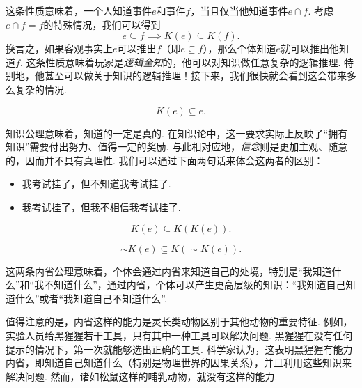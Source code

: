 这条性质意味着，一个人知道事件$e$和事件$f$，当且仅当他知道事件$e\cap f$. 考虑$e\cap f=f$的特殊情况，我们可以得到
\[e\subseteq f\implies K(e)\subseteq K(f).\]
换言之，如果客观事实上$e$可以推出$f$（即$e\subseteq f$），那么个体知道$e$就可以推出他知道$f$. 这条性质意味着玩家是\textit{逻辑全知}的，他可以对知识做任意复杂的逻辑推理. 特别地，他甚至可以做关于知识的逻辑推理！接下来，我们很快就会看到这会带来多么复杂的情况. 

\begin{proposition}
    \begin{equation}
        K(e)\subseteq e.\tag{K2}\label{eq:K2-knowledge}
    \end{equation}
\end{proposition}
知识公理意味着，知道的一定是真的. 在知识论中，这一要求实际上反映了“拥有知识”需要付出努力、值得一定的奖励. 与此相对应地，\textit{信念}则是更加主观、随意的，因而并不具有真理性. 我们可以通过下面两句话来体会这两者的区别：
    \begin{itemize}
        \item 我考试挂了，但不知道我考试挂了.
        \item 我考试挂了，但我不相信我考试挂了.
    \end{itemize}

\begin{proposition}[正内省公理]
    \begin{equation}
        K(e)\subseteq K(K(e)).\tag{K3}\label{eq:K3-positive-introspection}
    \end{equation}
\end{proposition}

\begin{proposition}[负内省公理]
    \begin{equation}
        \sim K(e)\subseteq K(\sim K(e)).\tag{K4}\label{eq:K4-negative-introspection}
    \end{equation}
\end{proposition}

这两条内省公理意味着，个体会通过内省来知道自己的处境，特别是“我知道什么”和“我不知道什么”，通过内省，个体可以产生更高层级的知识：“我知道自己知道什么”或者“我知道自己不知道什么”. 

值得注意的是，内省这样的能力是灵长类动物区别于其他动物的重要特征. 例如，实验人员给黑猩猩若干工具，只有其中一种工具可以解决问题. 黑猩猩在没有任何提示的情况下，第一次就能够选出正确的工具. 科学家认为，这表明黑猩猩有能力内省，即知道自己知道什么（特别是物理世界的因果关系），并且利用这些知识来解决问题. 然而，诸如松鼠这样的哺乳动物，就没有这样的能力.

